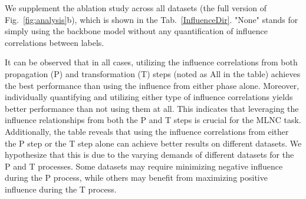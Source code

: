 We supplement the ablation study across all datasets (the full version of Fig.~\ref{fig:analysis}b), which is shown in the Tab.~\ref{InfluenceDir}. 
"None" stands for simply using the backbone model without any quantification of influence correlations between labels.


\begin{table}[!ht]
    \centering
    \caption{Ablation study of label influences (GCN as backbone).}
    \label{InfluenceDir}
\end{table}

It can be observed that in all cases, utilizing the influence correlations from both propagation (P) and transformation (T) steps (noted as All in the table) achieves the best performance than using the influence from either phase alone.
Moreover, individually quantifying and utilizing either type of influence correlations yields better performance than not using them at all.
This indicates that leveraging the influence relationships from both the P and T steps is crucial for the MLNC task.
Additionally, the table reveals that using the influence correlations from either the P step or the T step alone can achieve better results on different datasets. We hypothesize that this is due to the varying demands of different datasets for the P and T processes. Some datasets may require minimizing negative influence during the P process, while others may benefit from maximizing positive influence during the T process.



